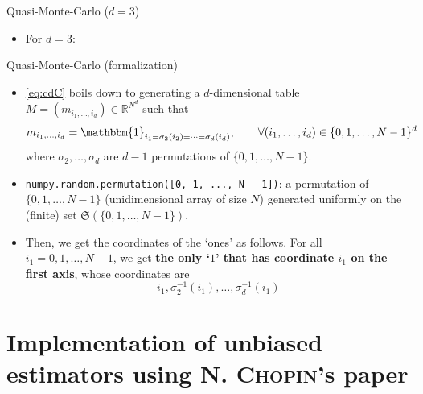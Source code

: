 \documentclass[aspectratio=169,xcolor=dvipsnames]{beamer}
\newcommand{\bdOne}{\mathbbm{1}}
\begin{document}
    \begin{frame}{Quasi-Monte-Carlo ($d = 3$)}
        \begin{itemize}
            \item For $d = 3$:
            \begin{center}
            \end{center}
        \end{itemize}
    \end{frame}

    \begin{frame}{Quasi-Monte-Carlo (formalization)}
        \begin{itemize}
            \item<1-> \eqref{eq:cdC} boils down to generating a $d$-dimensional table $M = (m_{i_1, \dots, i_d}) \in \mathbb{R}^{N^d}$ such that
            \[m_{i_1, \dots, i_d} = \bdOne_{i_1 = \sigma_2(i_2) = \cdots = \sigma_d(i_d)}, \qquad \forall (i_1, \dots, i_d) \in \{0, 1, \dots, N - 1\}^d\]
            where $\sigma_2, \dots, \sigma_d$ are $d - 1$ permutations of $\{0, 1, \dots, N - 1\}$.

            \item<2-> \texttt{numpy.random.permutation([0, 1, ..., N - 1])}: a permutation of $\{0, 1, \dots, N - 1\}$ (unidimensional array of size $N$) generated uniformly on the (finite) set $\mathfrak{S}(\{0, 1, \dots, N - 1\})$.

            \item<3-> Then, we get the coordinates of the `ones' as follows. For all $i_1 = 0, 1, \dots, N - 1$, we get \textbf{the only `$1$' that has coordinate $i_1$ on the first axis}, whose coordinates are
            \[i_1, \sigma_2^{-1}(i_1), \dots, \sigma_d^{-1}(i_1)\]
        \end{itemize}
    \end{frame}

    \section{Implementation of unbiased estimators using N. \textsc{Chopin}'s paper}
\end{document}
